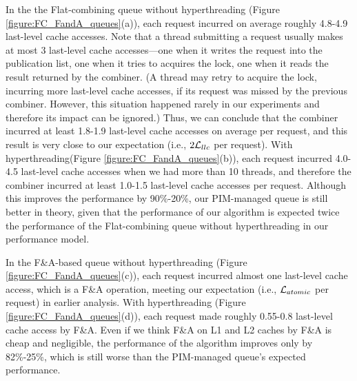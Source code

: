 In the the Flat-combining queue without hyperthreading (Figure \ref{figure:FC_FandA_queues}(a)), 
each request incurred on average roughly 4.8-4.9 last-level cache accesses. 
Note that a thread submitting a request usually makes at most 3 last-level cache accesses---one 
when it writes the request into the publication list, one when it tries to acquires the lock, 
one when it reads the result returned by the combiner. 
(A thread may retry to acquire the lock, incurring more last-level cache accesses, 
if its request was missed by the previous combiner. 
However, this situation happened rarely in our experiments and therefore its impact can be ignored.) 
Thus, we can conclude that the combiner incurred at least 1.8-1.9 last-level cache accesses 
on average per request, and this result is very close to our expectation (i.e., $2\mathcal{L}_{llc}$ per request). 
With hyperthreading(Figure \ref{figure:FC_FandA_queues}(b)), 
each request incurred 4.0-4.5 last-level cache accesses when we had more than 10 threads, 
and therefore the combiner incurred at least 1.0-1.5 last-level cache accesses per request. 
Although this improves the performance by 90\%-20\%, our PIM-managed queue is still better in theory, 
given that the performance of our algorithm is expected twice the performance of 
the Flat-combining queue without hyperthreading in our performance model. 

In the F\&A-based queue without hyperthreading (Figure \ref{figure:FC_FandA_queues}(c)), 
each request incurred almost one last-level cache access, which is a F\&A operation, 
meeting our expectation (i.e., $\mathcal{L}_{atomic}$ per request) in earlier analysis. 
With hyperthreading (Figure \ref{figure:FC_FandA_queues}(d)), each request made roughly 
0.55-0.8 last-level cache access by F\&A. 
Even if we think F\&A on L1 and L2 caches by F\&A is cheap and negligible, 
the performance of the algorithm improves only by 82\%-25\%, which is still worse than 
the PIM-managed queue's expected performance. 


% 
